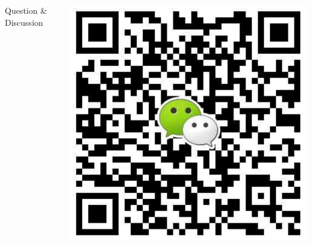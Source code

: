 \documentclass[12pt]{beamer}
\begin{document}
\begin{frame}
  \begin{columns}
    \begin{column}{0.5\textwidth}
      \huge{Question \& Discussion}

      
    \end{column}
    \begin{column}{0.5\textwidth}
        \includegraphics[width=\textwidth]{figures/wchat.jpg}  
    \end{column}

  \end{columns}
  \end{frame}
\end{document}

